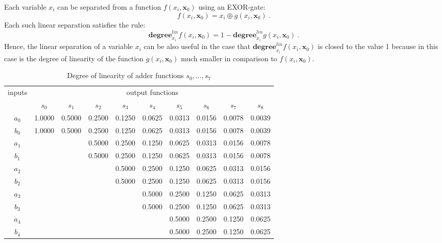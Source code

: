 \documentclass[12pt]{toptesi}
\newcommand\bx{\mathbf{x}}
\begin{document}
Each variable $x_i$ can be separated from a function $f(x_i,\bx_0)$ using an EXOR-gate:
\begin{equation}
f(x_i,\bx_0)= x_i \oplus g(x_i,\bx_0)~.
\label{equ:gen_lin_sep_xi}
\end{equation}
Each such linear separation satisfies the rule:
\begin{equation}
	\mathbf{degree}^{lin}_{x_i}f(x_i,\bx_0) = 1 - \mathbf{degree}^{lin}_{x_i}g(x_i,\bx_0)~.
\end{equation}
Hence, the linear separation of a variable $x_i$ can be also useful in the case that $\mathbf{degree}^{lin}_{x_i}f(x_i,\bx_0)$ is closed to the value 1 because in this case is the degree of linearity of the function $g(x_i,\bx_0)$ much smaller in comparison to $f(x_i,\bx_0)$.
\begin{table}
	\centering
	\caption{Degree of linearity of adder functions $s_0,\dots , s_7 $}
	\vspace{6pt}		
	\label{tab:dl_add_s0_s8}
		\begin{tabular}{cccccccccc}
\toprule
inputs & \multicolumn{9}{c}{output functions} \\
\cmidrule{2-10}
       & $s_0$  & $s_1$  & $s_2$  & $s_3$  & $s_4$  & $s_5$  & $s_6$  & $s_7$  & $s_8$  \\
\midrule
$a_0$	&  1.0000 & 0.5000 & 0.2500 & 0.1250 & 0.0625 & 0.0313 & 0.0156 & 0.0078 & 0.0039 \\	
$b_0$	&  1.0000 & 0.5000 & 0.2500 & 0.1250 & 0.0625 & 0.0313 & 0.0156 & 0.0078 & 0.0039 \\	
$a_1$	&         &        & 0.5000 & 0.2500 & 0.1250 & 0.0625 & 0.0313 & 0.0156 & 0.0078 \\	
$b_1$	&         &        & 0.5000 & 0.2500 & 0.1250 & 0.0625 & 0.0313 & 0.0156 & 0.0078 \\	
$a_2$	&         &        &        & 0.5000 & 0.2500 & 0.1250 & 0.0625 & 0.0313 & 0.0156 \\	
$b_2$	&         &        &        & 0.5000 & 0.2500 & 0.1250 & 0.0625 & 0.0313 & 0.0156 \\	
$a_3$	&         &        &        &        & 0.5000 & 0.2500 & 0.1250 & 0.0625 & 0.0313 \\	
$b_3$	&         &        &        &        & 0.5000 & 0.2500 & 0.1250 & 0.0625 & 0.0313 \\	
$a_4$	&         &        &        &        &        & 0.5000 & 0.2500 & 0.1250 & 0.0625 \\	
$b_4$	&         &        &        &        &        & 0.5000 & 0.2500 & 0.1250 & 0.0625 \\	

\end{tabular}
\end{table}
\end{document}
